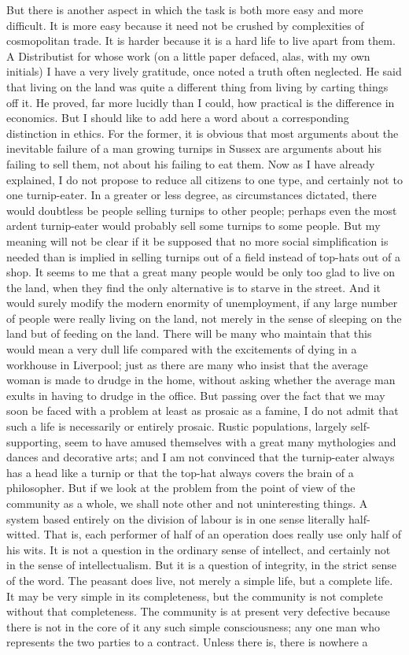 \documentclass{book}
\begin{document}
But there is another aspect in which the task is both more easy and more difficult. It is more easy because it need not be crushed by complexities of cosmopolitan trade. It is harder because it is a hard life to live apart from them. A Distributist for whose work (on a little paper defaced, alas, with my own initials) I have a very lively gratitude, once noted a truth often neglected. He said that living on the land was quite a different thing from living by carting things off it. He proved, far more lucidly than I could, how practical is the difference in economics. But I should like to add here a word about a corresponding distinction in ethics. For the former, it is obvious that most arguments about the inevitable failure of a man growing turnips in Sussex are arguments about his failing to sell them, not about his failing to eat them. Now as I have already explained, I do not propose to reduce all citizens to one type, and certainly not to one turnip-eater. In a greater or less degree, as circumstances dictated, there would doubtless be people selling turnips to other people; perhaps even the most ardent turnip-eater would probably sell some turnips to some people. But my meaning will not be clear if it be supposed that no more social simplification is needed than is implied in selling turnips out of a field instead of top-hats out of a shop. It seems to me that a great many people would be only too glad to live on the land, when they find the only alternative is to starve in the street. And it would surely modify the modern enormity of unemployment, if any large number of people were really living on the land, not merely in the sense of sleeping on the land but of feeding on the land. There will be many who maintain that this would mean a very dull life compared with the excitements of dying in a workhouse in Liverpool; just as there are many who insist that the average woman is made to drudge in the home, without asking whether the average man exults in having to drudge in the office. But passing over the fact that we may soon be faced with a problem at least as prosaic as a famine, I do not admit that such a life is necessarily or entirely prosaic. Rustic populations, largely self-supporting, seem to have amused themselves with a great many mythologies and dances and decorative arts; and I am not convinced that the turnip-eater always has a head like a turnip or that the top-hat always covers the brain of a philosopher. But if we look at the problem from the point of view of the community as a whole, we shall note other and not uninteresting things. A system based entirely on the division of labour is in one sense literally half-witted. That is, each performer of half of an operation does really use only half of his wits. It is not a question in the ordinary sense of intellect, and certainly not in the sense of intellectualism. But it is a question of integrity, in the strict sense of the word. The peasant does live, not merely a simple life, but a complete life. It may be very simple in its completeness, but the community is not complete without that completeness. The community is at present very defective because there is not in the core of it any such simple consciousness; any one man who represents the two parties to a contract. Unless there is, there is nowhere a 
\end{document}
